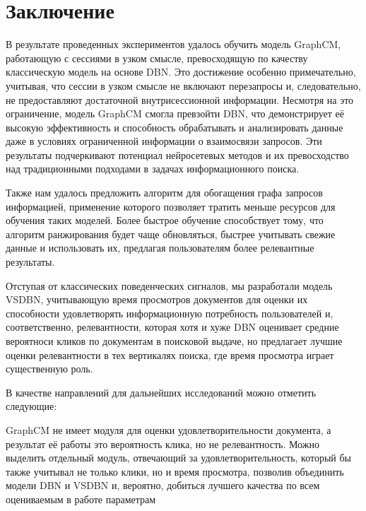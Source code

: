 \documentclass[diploma]{nanolab2015}
\begin{document}
\chapter{Заключение}
В результате проведенных экспериментов удалось обучить модель GraphCM, работающую с сессиями в узком смысле, превосходящую по качеству классическую модель на основе DBN. Это достижение особенно примечательно, учитывая, что сессии в узком смысле не включают перезапросы и, следовательно, не предоставляют достаточной внутрисессионной информации. Несмотря на это ограничение, модель GraphCM смогла превзойти DBN, что демонстрирует её высокую эффективность и способность обрабатывать и анализировать данные даже в условиях ограниченной информации о взаимосвязи запросов. Эти результаты подчеркивают потенциал нейросетевых методов и их превосходство над традиционными подходами в задачах информационного поиска.

Также нам удалось предложить алгоритм для обогащения графа запросов информацией, применение которого позволяет тратить меньше ресурсов для обучения таких моделей. Более быстрое обучение способствует тому, что алгоритм ранжирования будет чаще обновляться, быстрее учитывать свежие данные и использовать их, предлагая пользователям более релевантные результаты.

Отступая от классических поведенческих сигналов, мы разработали модель VSDBN, учитывающую время просмотров документов для оценки их способности удовлетворять информационную потребность пользователей и, соответственно, релевантности, которая хотя и хуже DBN оценивает средние вероятноси кликов по документам в поисковой выдаче, но предлагает лучшие оценки релевантности в тех вертикалях поиска, где время просмотра играет существенную роль. 

В качестве направлений для дальнейших исследований можно отметить следующие:
\begin{itemize}
    GraphCM не имеет модуля для оценки удовлетворительности документа, а результат её работы это вероятность клика, но не релевантность. Можно выделить отдельный модуль, отвечающий за удовлетворительность, который бы также учитывал не только клики, но и время просмотра, позволив объединить модели DBN и VSDBN и, вероятно, добиться лучшего качества по всем оцениваемым в работе параметрам
\end{itemize}
\end{document}
